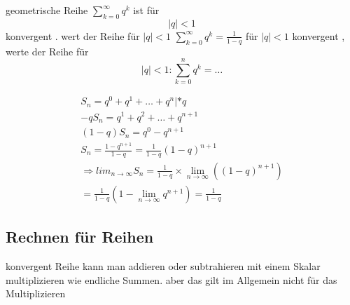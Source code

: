 \begin{example}
	geometrische Reihe $ \sum_{k=0}^{\infty} {q^k} $
	ist für $$ {|q|} < 1 $$ konvergent . wert der Reihe für $ {|q|} < 1 $  $\sum_{k=0}^{\infty} {q^k}= \frac{1}{1-q} $ für 
	$ {|q|} < 1 $  konvergent , werte der Reihe für 
	$$ {|q|} <1 : \sum_{k=0}^n{q^k}= \dots $$
	
	\begin{gather*}
	S_n = q^0 + q^1 + \dots + q^n | *q \\
	-q S_n = q^1 + q^2 + \dots + q^{n+1} \\
	(1-q)S_n=q^0 - q^{n+1} \\
	S_n = \frac{1-q^{n+1}}{1-q} = \frac{1}{1-q}(1-q)^{n+1}\\
	\Rightarrow lim_{n \to \infty}{S_n} = \frac{1}{1-q} \times 
	\lim_{n \to \infty}{((1-q)^{n+1})}\\
	=\frac{1}{1-q}(1- \lim_{n \to \infty}{q^{n+1}})=\frac{1}{1-q}
	\end{gather*}
	
	\subsection{Rechnen für Reihen}
	konvergent Reihe kann man addieren oder subtrahieren mit einem Skalar multiplizieren
	wie endliche Summen.
	aber das gilt im Allgemein nicht für das Multiplizieren  
\end{example}